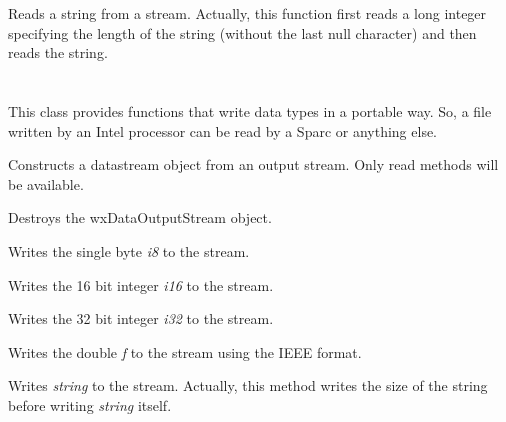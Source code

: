 
Reads a string from a stream. Actually, this function first reads a long integer
specifying the length of the string (without the last null character) and then
reads the string.


\section{}\label{wxdataoutputstream}

This class provides functions that write data types in a
portable way. So, a file written by an Intel processor can be read by a
Sparc or anything else.


\label{wxdataoutputstreamconstr}


Constructs a datastream object from an output stream. Only read methods will
be available.





Destroys the wxDataOutputStream object.



Writes the single byte {\it i8} to the stream.



Writes the 16 bit integer {\it i16} to the stream.



Writes the 32 bit integer {\it i32} to the stream.



Writes the double {\it f} to the stream using the IEEE format.



Writes {\it string} to the stream. Actually, this method writes the size of
the string before writing {\it string} itself.
